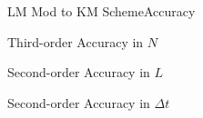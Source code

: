 \documentclass[\string~/GitHub/sthlmNordBeamerTheme/sthlmNordLightDemo.tex]{subfiles}
\begin{document}
\begin{frame}{LM Mod to KM Scheme}{Accuracy}
    \begin{exampleblock}{}
        Third-order Accuracy in $N$
    \end{exampleblock}

    \begin{exampleblock}{}
        Second-order Accuracy in $L$
    \end{exampleblock}

    \begin{exampleblock}{}
        Second-order Accuracy in $\Delta t$
    \end{exampleblock}
\end{frame}
\end{document}
